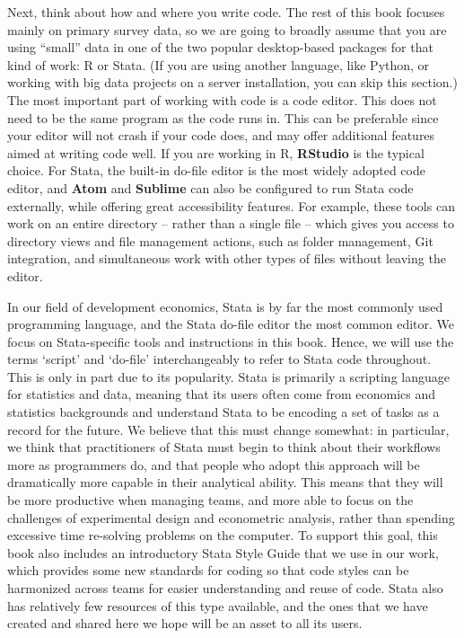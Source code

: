 Next, think about how and where you write code.
The rest of this book focuses mainly on primary survey data,
so we are going to broadly assume that you are using ``small'' data
in one of the two popular desktop-based packages for that kind of work: R or Stata.
(If you are using another language, like Python,
or working with big data projects on a server installation,
you can skip this section.)
The most important part of working with code is a code editor.
This does not need to be the same program as the code runs in.
This can be preferable since your editor will not crash if your code does,
and may offer additional features aimed at writing code well.
If you are working in R, \textbf{RStudio} is the typical choice.
For Stata, the built-in do-file editor is the most widely adopted code editor,
and \textbf{Atom} and \textbf{Sublime} can also be configured to run Stata code externally, while offering great accessibility features.
For example, these tools can work on an entire directory -- rather than a single file --
which gives you access to directory views and file management actions,
such as folder management, Git integration, and simultaneous work with other types of files without leaving the editor.

In our field of development economics,
Stata is by far the most commonly used programming language,
and the Stata do-file editor the most common editor.
We focus on Stata-specific tools and instructions in this book.
Hence, we will use the terms `script' and `do-file'
interchangeably to refer to Stata code throughout.
This is only in part due to its popularity.
Stata is primarily a scripting language for statistics and data,
meaning that its users often come from economics and statistics backgrounds
and understand Stata to be encoding a set of tasks as a record for the future.
We believe that this must change somewhat:
in particular, we think that practitioners of Stata
must begin to think about their workflows more as programmers do,
and that people who adopt this approach will be dramatically
more capable in their analytical ability.
This means that they will be more productive when managing teams,
and more able to focus on the challenges of experimental design
and econometric analysis, rather than spending excessive time
re-solving problems on the computer.
To support this goal, this book also includes
an introductory Stata Style Guide
that we use in our work, which provides
some new standards for coding so that code styles
can be harmonized across teams for easier understanding and reuse of code.
Stata also has relatively few resources of this type available,
and the ones that we have created and shared here
we hope will be an asset to all its users.

